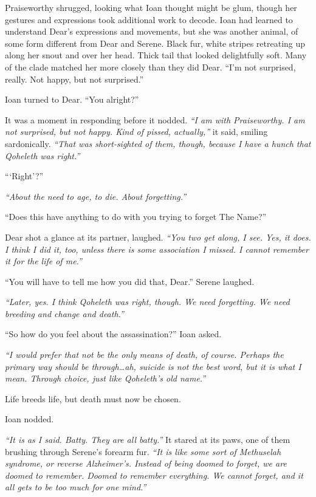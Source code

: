 Praiseworthy shrugged, looking what Ioan thought might be glum, though her gestures and expressions took additional work to decode. Ioan had learned to understand Dear's expressions and movements, but she was another animal, of some form different from Dear and Serene. Black fur, white stripes retreating up along her snout and over her head. Thick tail that looked delightfully soft. Many of the clade matched her more closely than they did Dear. ``I'm not surprised, really. Not happy, but not surprised.''

Ioan turned to Dear. ``You alright?''

It was a moment in responding before it nodded. \emph{``I am with Praiseworthy. I am not surprised, but not happy. Kind of pissed, actually,''} it said, smiling sardonically. \emph{``That was short-sighted of them, though, because I have a hunch that Qoheleth was right.''}

```Right'?''

\emph{``About the need to age, to die. About forgetting.''}

``Does this have anything to do with you trying to forget The Name?''

Dear shot a glance at its partner, laughed. \emph{``You two get along, I see. Yes, it does. I think I did it, too, unless there is some association I missed. I cannot remember it for the life of me.''}

``You will have to tell me how you did that, Dear.'' Serene laughed.

\emph{``Later, yes. I think Qoheleth was right, though. We need forgetting. We need breeding and change and death.''}

``So how do you feel about the assassination?'' Ioan asked.

\emph{``I would prefer that not be the only means of death, of course. Perhaps the primary way should be through\ldots{}ah, suicide is not the best word, but it is what I mean. Through choice, just like Qoheleth's old name.''}

Life breeds life, but death must now be chosen.

Ioan nodded.

\emph{``It is as I said. Batty. They are all batty.''} It stared at its paws, one of them brushing through Serene's forearm fur. \emph{``It is like some sort of Methuselah syndrome, or reverse Alzheimer's. Instead of being doomed to forget, we are doomed to remember. Doomed to remember everything. We cannot forget, and it all gets to be too much for one mind.''}

